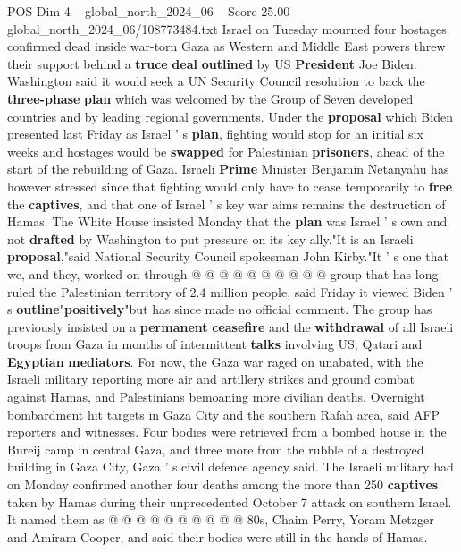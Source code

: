 \begin{textsample}{POS Dim 4 – global\_north\_2024\_06 – Score 25.00 – global\_north\_2024\_06/108773484.txt}  \label{ex:f4_pos_144}
Israel on Tuesday mourned four hostages confirmed dead inside war-torn Gaza as Western and Middle East powers threw their support behind a \textbf{truce} \textbf{deal} \textbf{outlined} by US \textbf{President} Joe Biden.
Washington said it would seek a UN Security Council resolution to back the \textbf{three-phase} \textbf{plan} which was welcomed by the Group of Seven developed countries and by leading regional governments.
Under the \textbf{proposal} which Biden presented last Friday as Israel ' s \textbf{plan}, fighting would stop for an initial six weeks and hostages would be \textbf{swapped} for Palestinian \textbf{prisoners}, ahead of the start of the rebuilding of Gaza.
Israeli \textbf{Prime} Minister Benjamin Netanyahu has however stressed since that fighting would only have to cease temporarily to \textbf{free} the \textbf{captives}, and that one of Israel ' s key war aims remains the destruction of Hamas.
The White House insisted Monday that the \textbf{plan} was Israel ' s own and not \textbf{drafted} by Washington to put pressure on its key ally."It is an Israeli \textbf{proposal},"said National Security Council spokesman John Kirby."It ' s one that we, and they, worked on through @ @ @ @ @ @ @ @ @ @ group that has long ruled the Palestinian territory of 2.4 million people, said Friday it viewed Biden ' s \textbf{outline}"\textbf{positively}"but has since made no official comment.
The group has previously insisted on a \textbf{permanent} \textbf{ceasefire} and the \textbf{withdrawal} of all Israeli troops from Gaza in months of intermittent \textbf{talks} involving US, Qatari and \textbf{Egyptian} \textbf{mediators}.
For now, the Gaza war raged on unabated, with the Israeli military reporting more air and artillery strikes and ground combat against Hamas, and Palestinians bemoaning more civilian deaths.
Overnight bombardment hit targets in Gaza City and the southern Rafah area, said AFP reporters and witnesses.
Four bodies were retrieved from a bombed house in the Bureij camp in central Gaza, and three more from the rubble of a destroyed building in Gaza City, Gaza ' s civil defence agency said.
The Israeli military had on Monday confirmed another four deaths among the more than 250 \textbf{captives} taken by Hamas during their unprecedented October 7 attack on southern Israel.
It named them as @ @ @ @ @ @ @ @ @ @ 80s, Chaim Perry, Yoram Metzger and Amiram Cooper, and said their bodies were still in the hands of Hamas.

\end{textsample}
